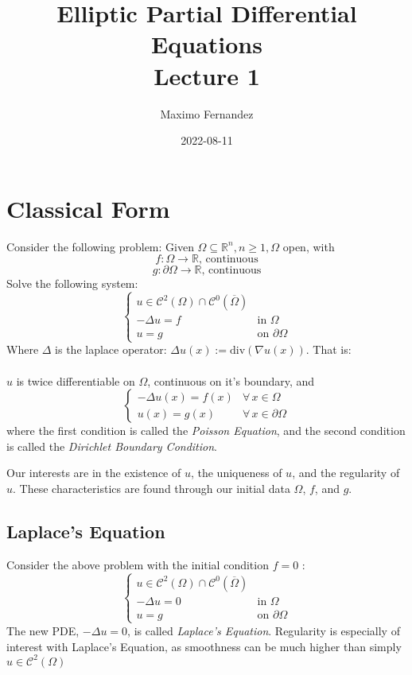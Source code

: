 \documentclass[12pt]{article}
\author{Maximo Fernandez}
\title{Elliptic Partial Differential Equations\\ Lecture 1}
\date{
    2022-08-11
}
\begin{document}
\maketitle
\section{Classical Form}
\label{sec:classical_form}
Consider the following problem: 
Given $\Omega\subseteq\mathbb{R}^{n},n \ge 1, \Omega$ open, with
\[
    f:\Omega\to\mathbb{R}\text{, continuous}
\] 
\[
    g:\partial\Omega\to\mathbb{R}\text{, continuous}
\] 
Solve the following system:
\[
\begin{cases}
    u\in\mathcal{C}^2(\Omega)\cap\mathcal{C}^{0}(\overline{\Omega})\\
    -\Delta u = f & \text{in }\Omega\\
    u = g & \text{on }\partial\Omega
\end{cases}
\] 
Where $\Delta$ is the laplace operator: $\Delta u(x):=\text{div}(\nabla u(x)) $.
That is:\\
\\
$u$ is twice differentiable on $\Omega$, continuous on it's boundary, and\\
\[
\begin{cases}
    -\Delta u(x) = f(x) & \forall\, x\in \Omega\\
    u(x) = g(x) & \forall\, x\in\partial\Omega
\end{cases}
\]
where the first condition is called the \emph{Poisson Equation}, and the second condition is called the \emph{Dirichlet Boundary Condition}.

Our interests are in the existence of $u$, the uniqueness of $u$, and the regularity of $u$. These characteristics are found through our initial data $\Omega$, $f$, and $g$.
\subsection{Laplace's Equation}
\label{sub:laplace_s_equation}
Consider the above problem with the initial condition $f=0$ :
\[
\begin{cases}
    u\in\mathcal{C}^2(\Omega)\cap\mathcal{C}^{0}(\overline{\Omega})\\
    -\Delta u = 0 & \text{in }\Omega\\
    u = g & \text{on }\partial\Omega
\end{cases}
\]
The new PDE, $-\Delta u = 0$, is called \emph{Laplace's Equation}. Regularity is especially of interest with Laplace's Equation, as smoothness can be much higher than simply $u\in \mathcal{C}^2(\Omega)$
\end{document}
